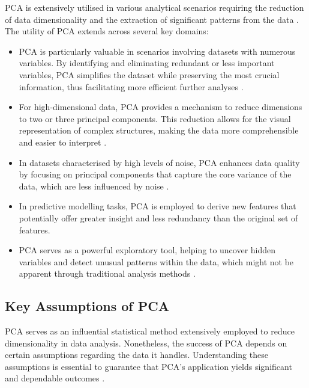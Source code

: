 \documentclass[conference]{IEEEtran}
\begin{document}
PCA is extensively utilised in various analytical scenarios requiring the reduction of data dimensionality and the extraction of significant patterns from the data \cite{wang2003feature}. The utility of PCA extends across several key domains:
\begin{itemize}
    \item PCA is particularly valuable in scenarios involving datasets with numerous variables. By identifying and eliminating redundant or less important variables, PCA simplifies the dataset while preserving the most crucial information, thus facilitating more efficient further analyses \cite{wu2007feature}.
    \item For high-dimensional data, PCA provides a mechanism to reduce dimensions to two or three principal components. This reduction allows for the visual representation of complex structures, making the data more comprehensible and easier to interpret \cite{hasan2021review}.
    \item In datasets characterised by high levels of noise, PCA enhances data quality by focusing on principal components that capture the core variance of the data, which are less influenced by noise \cite{ivosev2008dimensionality}.
    \item In predictive modelling tasks, PCA is employed to derive new features that potentially offer greater insight and less redundancy than the original set of features\cite{wang2003feature}.
    \item PCA serves as a powerful exploratory tool, helping to uncover hidden variables and detect unusual patterns within the data, which might not be apparent through traditional analysis methods \cite{wu2007feature}.

\end{itemize}







\subsection{Key Assumptions of PCA}
PCA serves as an influential statistical method extensively employed to reduce dimensionality in data analysis. Nonetheless, the success of PCA depends on certain assumptions regarding the data it handles. Understanding these assumptions is essential to guarantee that PCA's application yields significant and dependable outcomes \cite{bro2014principal, shlens2014tutorial, wold1987principal, candes2011robust, mckeown1998independent}.
\end{document}
